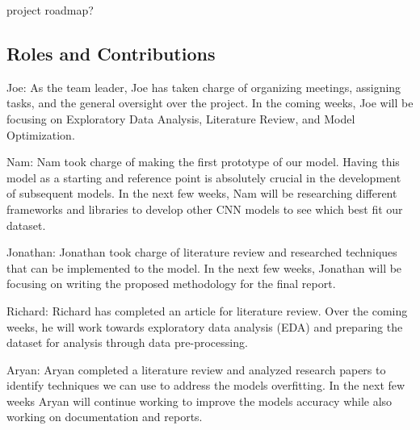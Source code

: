 \documentclass[conference]{IEEEtran}
\begin{document}
project roadmap? 

\subsection{\large Roles and Contributions}

Joe: As the team leader, Joe has taken charge of organizing meetings, assigning tasks, and the general oversight over the project. In the coming weeks, Joe will be focusing on Exploratory Data Analysis, Literature Review, and Model Optimization. 

Nam: Nam took charge of making the first prototype of our model. Having this model as a starting and reference point is absolutely crucial in the development of subsequent models. In the next few weeks, Nam will be researching different frameworks and libraries to develop other CNN models to see which best fit our dataset.

Jonathan: Jonathan took charge of literature review and researched techniques that can be implemented to the model. In the next few weeks, Jonathan will be focusing on writing the proposed methodology for the final report.

Richard: Richard has completed an article for literature review. Over the coming weeks, he will work towards exploratory data analysis (EDA) and preparing the dataset for analysis through data pre-processing.

Aryan: Aryan completed a literature review and analyzed research papers to identify techniques we can use to address the models overfitting. In the next few weeks Aryan will continue working to improve the models accuracy while also working on documentation and reports. 
\end{document}
